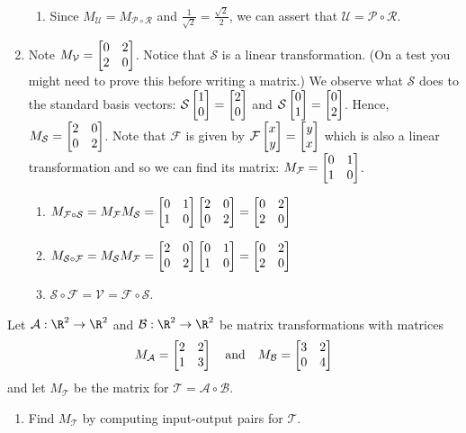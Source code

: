 \begin{exercises}
\begin{problist}
\begin{solution}
\begin{enumerate}
\begin{enumerate}
					\item Since $M_\mathcal U=M_{\mathcal P \circ \mathcal R}$ and $\tfrac{1}{\sqrt{2}}=\tfrac{\sqrt{2}}{2}$, we can assert that $\mathcal U=\mathcal P \circ \mathcal R$.
				\end{enumerate}
				\item Note $M_\mathcal V=\mat{0&2\\2&0}$. Notice that $\mathcal S$ is a linear transformation. (On a test you might need to prove this before writing a matrix.) We observe what $\mathcal S$ does to the standard basis vectors: $\mathcal S\mat{1\\0}=\mat{2\\0}$ and $\mathcal S\mat{0\\1}=\mat{0\\2}$. Hence, $M_\mathcal S=\mat{2&0\\0&2}$. Note that $\mathcal F$ is given by $\mathcal F\mat{x\\y}=\mat{y\\x}$ which is also a linear transformation and so we can find its matrix: $M_\mathcal F=\mat{0&1\\1&0}$.
				\begin{enumerate}
				    \item $M_{\mathcal F \circ \mathcal S}=M_\mathcal F M_\mathcal S=\mat{0&1\\1&0}\mat{2&0\\0&2}=\mat{0&2\\2&0}$
				    \item $M_{\mathcal S \circ \mathcal F}=M_\mathcal S M_\mathcal F=\mat{2&0\\0&2}\mat{0&1\\1&0}=\mat{0&2\\2&0}$
				    \item $\mathcal S\circ \mathcal F= \mathcal V = \mathcal F \circ \mathcal S$.
				\end{enumerate}
			\end{enumerate}	
		\end{solution}

		\prob Let $\mathcal A: \R^{2} \to \R^{2}$ and
		$\mathcal B: \R^{2} \to \R^{2}$ be matrix transformations with
		matrices
		\[
			M_{\mathcal A}= \mat{2&2\\1&3}\quad \text{and} \quad M_{\mathcal
			B}= \mat{3&2\\0&4}
		\]
		 and let $M_{\mathcal T}$ be the matrix for $\mathcal T=\mathcal A\circ\mathcal B$.
		\begin{enumerate}
			\item Find $M_{\mathcal T}$ by computing input-output pairs for $\mathcal
				T$.


\end{enumerate}
\end{problist}
\end{exercises}
